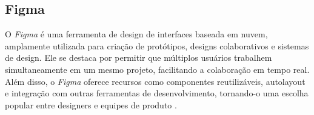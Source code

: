 {    \subsection{Figma}
    O \textit{Figma} é uma ferramenta de design de interfaces baseada em nuvem, amplamente utilizada para criação de protótipos, designs colaborativos e sistemas de design. Ele se destaca por permitir que múltiplos usuários trabalhem simultaneamente em um mesmo projeto, facilitando a colaboração em tempo real. Além disso, o \textit{Figma} oferece recursos como componentes reutilizáveis, autolayout e integração com outras ferramentas de desenvolvimento, tornando-o uma escolha popular entre designers e equipes de produto \citep{figma}.
    
    
    
    
    
}
